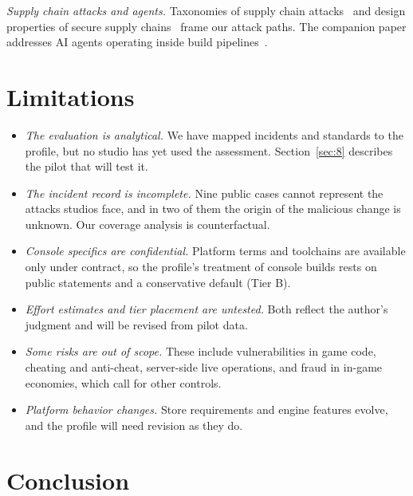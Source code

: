 \documentclass[acmsmall,screen,review]{acmart}
\begin{document}
\emph{Supply chain attacks and agents.} Taxonomies of supply chain attacks~\cite{ladisa2023sok} and design properties of secure supply chains~\cite{okafor2022sok} frame our attack paths. The companion paper addresses AI agents operating inside build pipelines~\cite{keluoudeke2026untrusted}.


\section{Limitations}\label{sec:10}

\begin{itemize}
\item \emph{The evaluation is analytical.} We have mapped incidents and standards to the profile, but no studio has yet used the assessment. Section~\ref{sec:8} describes the pilot that will test it.
\item \emph{The incident record is incomplete.} Nine public cases cannot represent the attacks studios face, and in two of them the origin of the malicious change is unknown. Our coverage analysis is counterfactual.
\item \emph{Console specifics are confidential.} Platform terms and toolchains are available only under contract, so the profile's treatment of console builds rests on public statements and a conservative default (Tier B).
\item \emph{Effort estimates and tier placement are untested.} Both reflect the author's judgment and will be revised from pilot data.
\item \emph{Some risks are out of scope.} These include vulnerabilities in game code, cheating and anti-cheat, server-side live operations, and fraud in in-game economies, which call for other controls.
\item \emph{Platform behavior changes.} Store requirements and engine features evolve, and the profile will need revision as they do.
\end{itemize}


\section{Conclusion}\label{sec:11}
\end{document}
